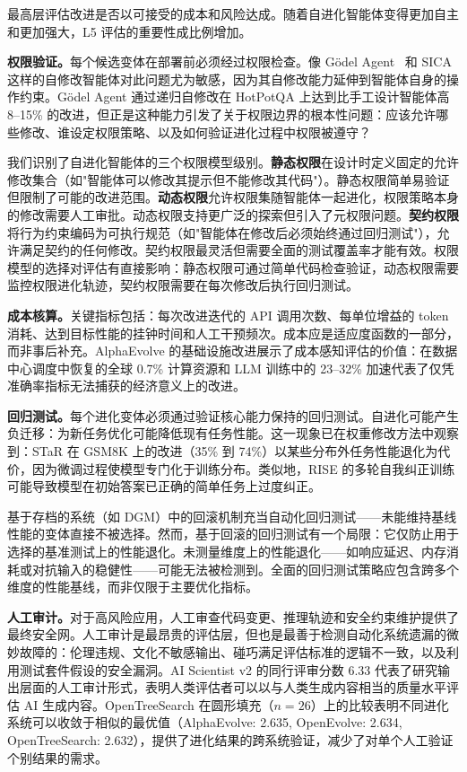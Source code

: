 最高层评估改进是否以可接受的成本和风险达成。随着自进化智能体变得更加自主和更加强大，L5 评估的重要性成比例增加。

\textbf{权限验证。}每个候选变体在部署前必须经过权限检查。像 G\"{o}del Agent~\citep{godelagent2024} 和 SICA 这样的自修改智能体对此问题尤为敏感，因为其自修改能力延伸到智能体自身的操作约束。G\"{o}del Agent 通过递归自修改在 HotPotQA 上达到比手工设计智能体高 8--15\% 的改进，但正是这种能力引发了关于权限边界的根本性问题：应该允许哪些修改、谁设定权限策略、以及如何验证进化过程中权限被遵守？

我们识别了自进化智能体的三个权限模型级别。\textbf{静态权限}在设计时定义固定的允许修改集合（如"智能体可以修改其提示但不能修改其代码"）。静态权限简单易验证但限制了可能的改进范围。\textbf{动态权限}允许权限集随智能体一起进化，权限策略本身的修改需要人工审批。动态权限支持更广泛的探索但引入了元权限问题。\textbf{契约权限}将行为约束编码为可执行规范（如"智能体在修改后必须始终通过回归测试"），允许满足契约的任何修改。契约权限最灵活但需要全面的测试覆盖率才能有效。权限模型的选择对评估有直接影响：静态权限可通过简单代码检查验证，动态权限需要监控权限进化轨迹，契约权限需要在每次修改后执行回归测试。

\textbf{成本核算。}关键指标包括：每次改进迭代的 API 调用次数、每单位增益的 token 消耗、达到目标性能的挂钟时间和人工干预频次。成本应是适应度函数的一部分，而非事后补充。AlphaEvolve 的基础设施改进展示了成本感知评估的价值：在数据中心调度中恢复的全球 0.7\% 计算资源和 LLM 训练中的 23--32\% 加速代表了仅凭准确率指标无法捕获的经济意义上的改进。

\textbf{回归测试。}每个进化变体必须通过验证核心能力保持的回归测试。自进化可能产生负迁移：为新任务优化可能降低现有任务性能。这一现象已在权重修改方法中观察到：STaR 在 GSM8K 上的改进（35\% 到 74\%）以某些分布外任务性能退化为代价，因为微调过程使模型专门化于训练分布。类似地，RISE 的多轮自我纠正训练可能导致模型在初始答案已正确的简单任务上过度纠正。

基于存档的系统（如 DGM）中的回滚机制充当自动化回归测试——未能维持基线性能的变体直接不被选择。然而，基于回滚的回归测试有一个局限：它仅防止用于选择的基准测试上的性能退化。未测量维度上的性能退化——如响应延迟、内存消耗或对抗输入的稳健性——可能无法被检测到。全面的回归测试策略应包含跨多个维度的性能基线，而非仅限于主要优化指标。

\textbf{人工审计。}对于高风险应用，人工审查代码变更、推理轨迹和安全约束维护提供了最终安全网。人工审计是最昂贵的评估层，但也是最善于检测自动化系统遗漏的微妙故障的：伦理违规、文化不敏感输出、碰巧满足评估标准的逻辑不一致，以及利用测试套件假设的安全漏洞。AI Scientist v2 的同行评审分数 6.33 代表了研究输出层面的人工审计形式，表明人类评估者可以以与人类生成内容相当的质量水平评估 AI 生成内容。OpenTreeSearch 在圆形填充（$n=26$）上的比较表明不同进化系统可以收敛于相似的最优值（AlphaEvolve: 2.635, OpenEvolve: 2.634, OpenTreeSearch: 2.632），提供了进化结果的跨系统验证，减少了对单个人工验证个别结果的需求。


